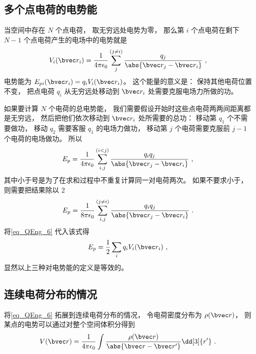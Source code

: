 \subsection{多个点电荷的电势能}\label{sub_QEng_1}
 当空间中存在 $N$ 个点电荷， 取无穷远处电势为零， 那么第 $i$ 个点电荷在剩下 $N-1$ 个点电荷产生的电场中的电势就是
\begin{equation}\label{eq_QEng_6}
V_i(\bvec r_i) = \frac{1}{4\pi\epsilon_0} \sum_j^{(j\ne i)} \frac{q_j}{\abs{\bvec r_j - \bvec r_i}}~,
\end{equation}
电势能为 $E_{pi}(\bvec r_i) = q_i V_i(\bvec r_i)$。 这个能量的意义是： 保持其他电荷位置不变， 把点电荷 $q_i$ 从无穷远处移动到 $\bvec r_i$ 处需要克服电场力所做的功。

如果要计算 $N$ 个电荷的总电势能， 我们需要假设开始时这些点电荷两两间距离都是无穷远， 然后把他们依次移动到 $\bvec r_i$ 处所需要的总功： 移动第 $q_1$ 个不需要做功， 移动 $q_2$ 需要客服 $q_1$ 的电场力做功， 移动第 $j$ 个电荷需要克服前 $j-1$ 个电荷的电场做功。 所以
\begin{equation}\label{eq_QEng_10}
E_p = \frac{1}{4\pi\epsilon_0} \sum_{i,j}^{(i < j)} \frac{q_i q_j}{\abs{\bvec r_j - \bvec r_i}}~,
\end{equation}
其中小于号是为了在求和过程中不重复计算同一对电荷两次。 如果不要求小于， 则需要把结果除以 2
\begin{equation}
E_p = \frac{1}{8\pi\epsilon_0} \sum_{i, j}^{(j\neq i)} \frac{q_i q_j}{\abs{\bvec r_j - \bvec r_i}}~.
\end{equation}
将\autoref{eq_QEng_6} 代入该式得
\begin{equation}\label{eq_QEng_7}
E_p = \frac12 \sum_i q_i V_i(\bvec r_i)~,
\end{equation}
显然以上三种对电势能的定义是等效的。

\subsection{连续电荷分布的情况}
将\autoref{eq_QEng_6} 拓展到连续电荷分布的情况， 令电荷密度分布为 $\rho(\bvec r)$， 则某点的电势可以通过对整个空间体积分得到
\begin{equation}\label{eq_QEng_11}
V(\bvec r) = \frac{1}{4\pi\epsilon_0} \int \frac{\rho(\bvec r)}{\abs{\bvec r - \bvec r'}} \dd[3]{r'}~.
\end{equation}

